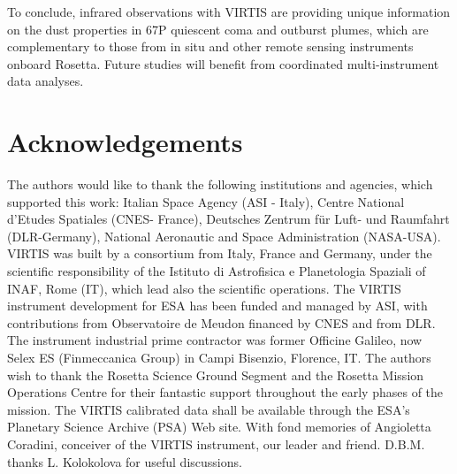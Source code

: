 \documentclass[a4paper,fleqn,usenatbib]{mnras}
\begin{document}
To conclude, infrared observations with VIRTIS are providing unique information on the dust properties in 67P quiescent coma and outburst plumes, which are complementary to those from in situ and other remote sensing instruments onboard Rosetta. Future studies will benefit from coordinated multi-instrument data analyses.


\section*{Acknowledgements}
The authors would like to thank the following institutions and
agencies,  which supported this work: Italian Space Agency (ASI -
Italy), Centre National d'Etudes Spatiales (CNES- France),
Deutsches Zentrum f\"{u}r Luft- und Raumfahrt (DLR-Germany),
National Aeronautic and Space Administration (NASA-USA). VIRTIS
was built by a consortium from Italy, France and Germany, under
the scientific responsibility of the Istituto di Astrofisica e
Planetologia Spaziali of INAF, Rome (IT), which lead also the
scientific operations.  The VIRTIS instrument development for ESA
has been funded and managed by ASI, with contributions from
Observatoire de Meudon financed by CNES and from DLR. The
instrument industrial prime contractor was former Officine
Galileo, now Selex ES (Finmeccanica Group) in Campi Bisenzio,
Florence, IT. The authors wish to thank the Rosetta Science Ground
Segment and the Rosetta Mission Operations Centre for their
fantastic support throughout the early phases of the mission. The
VIRTIS calibrated data shall be available through the ESA's
Planetary Science Archive (PSA) Web site. With fond memories of
Angioletta Coradini, conceiver of the VIRTIS instrument, our
leader and friend. D.B.M. thanks L. Kolokolova for useful discussions.
\end{document}
